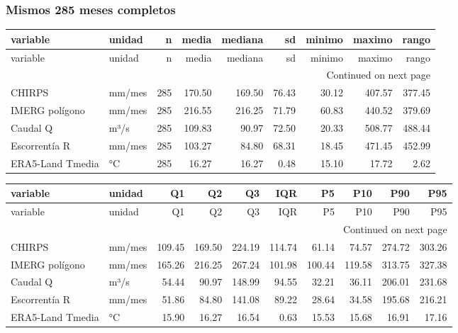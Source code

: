 \documentclass[10pt,a4paper]{article}
\begin{document}
\subsubsection*{Mismos 285 meses completos}
{\scriptsize
\begin{longtable}{llrrrrrrr}
\toprule
variable & unidad & n & media & mediana & sd & minimo & maximo & rango \\
\midrule
\endfirsthead
\toprule
variable & unidad & n & media & mediana & sd & minimo & maximo & rango \\
\midrule
\endhead
\midrule
\multicolumn{9}{r}{Continued on next page} \\
\midrule
\endfoot
\bottomrule
\endlastfoot
CHIRPS & mm/mes & 285 & 170.50 & 169.50 & 76.43 & 30.12 & 407.57 & 377.45 \\
IMERG polígono & mm/mes & 285 & 216.55 & 216.25 & 71.79 & 60.83 & 440.52 & 379.69 \\
Caudal Q & m³/s & 285 & 109.83 & 90.97 & 72.50 & 20.33 & 508.77 & 488.44 \\
Escorrentía R & mm/mes & 285 & 103.27 & 84.80 & 68.31 & 18.45 & 471.45 & 452.99 \\
ERA5-Land Tmedia & °C & 285 & 16.27 & 16.27 & 0.48 & 15.10 & 17.72 & 2.62 \\
\end{longtable}
}
{\scriptsize
\begin{longtable}{llrrrrrrrr}
\toprule
variable & unidad & Q1 & Q2 & Q3 & IQR & P5 & P10 & P90 & P95 \\
\midrule
\endfirsthead
\toprule
variable & unidad & Q1 & Q2 & Q3 & IQR & P5 & P10 & P90 & P95 \\
\midrule
\endhead
\midrule
\multicolumn{10}{r}{Continued on next page} \\
\midrule
\endfoot
\bottomrule
\endlastfoot
CHIRPS & mm/mes & 109.45 & 169.50 & 224.19 & 114.74 & 61.14 & 74.57 & 274.72 & 303.26 \\
IMERG polígono & mm/mes & 165.26 & 216.25 & 267.24 & 101.98 & 100.44 & 119.58 & 313.75 & 327.38 \\
Caudal Q & m³/s & 54.44 & 90.97 & 148.99 & 94.55 & 32.21 & 36.11 & 206.01 & 231.68 \\
Escorrentía R & mm/mes & 51.86 & 84.80 & 141.08 & 89.22 & 28.64 & 34.58 & 195.68 & 216.21 \\
ERA5-Land Tmedia & °C & 15.90 & 16.27 & 16.54 & 0.63 & 15.53 & 15.68 & 16.91 & 17.16 \\
\end{longtable}
}
\end{document}
